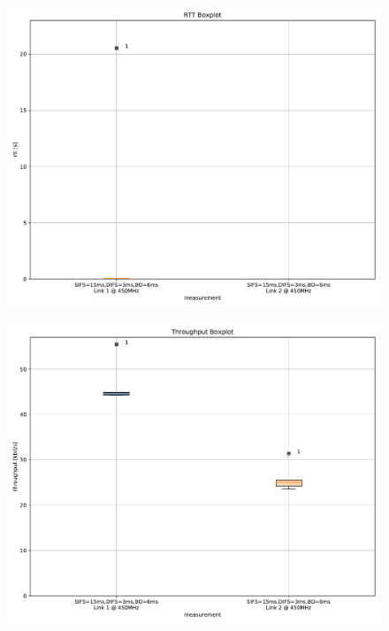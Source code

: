 \documentclass{article}
\begin{document}
\begin{figure}
	\includegraphics[width=\textwidth]{rb_high_dual/boxplot/rtt_boxplot}
\end{figure}

\begin{figure}
	\includegraphics[width=\textwidth]{rb_high_dual/boxplot/throughput_boxplot}
\end{figure}


\end{document}
